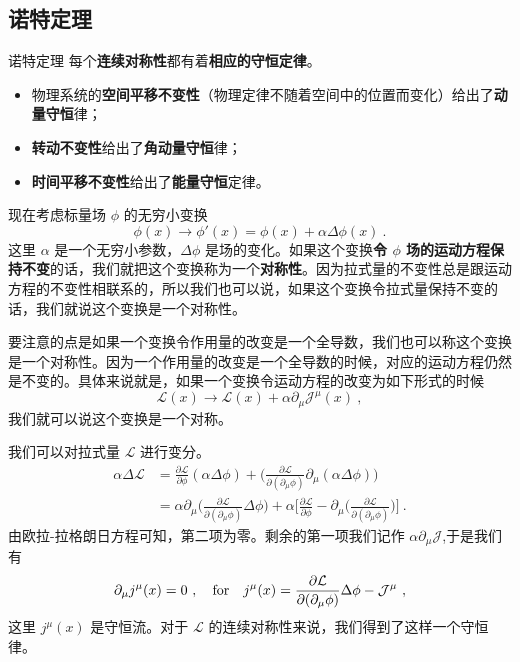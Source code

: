\subsection{诺特定理}
\begin{theorem}{诺特定理}
每个\textbf{连续对称性}都有着\textbf{相应的守恒定律}。
\begin{itemize}
\item 物理系统的\textbf{空间平移不变性}（物理定律不随着空间中的位置而变化）给出了\textbf{动量守恒}律；
\item \textbf{转动不变性}给出了\textbf{角动量守恒}律；
\item \textbf{时间平移不变性}给出了\textbf{能量守恒}定律。
\end{itemize}
\end{theorem}
现在考虑标量场 $\phi$ 的无穷小变换
\begin{equation}
\phi(x) \rightarrow \phi'(x) = \phi(x) +\alpha \Delta \phi (x)~.
\end{equation}
这里 $\alpha$ 是一个无穷小参数，$\Delta \phi$ 是场的变化。如果这个变换\textbf{令 $\phi$ 场的运动方程保持不变}的话，我们就把这个变换称为一个\textbf{对称性}。因为拉式量的不变性总是跟运动方程的不变性相联系的，所以我们也可以说，如果这个变换令拉式量保持不变的话，我们就说这个变换是一个对称性。

要注意的点是如果一个变换令作用量的改变是一个全导数，我们也可以称这个变换是一个对称性。因为一个作用量的改变是一个全导数的时候，对应的运动方程仍然是不变的。具体来说就是，如果一个变换令运动方程的改变为如下形式的时候
\begin{equation}
\mathcal L(x) \rightarrow \mathcal L (x) +\alpha \partial_\mu \mathcal J^\mu (x)~,
\end{equation}
我们就可以说这个变换是一个对称。

我们可以对拉式量 $\mathcal L$ 进行变分。
\begin{align}\nonumber
\alpha \Delta \mathcal L & = \frac{\partial \mathcal L}{\partial \phi} (\alpha \Delta \phi) + \bigg( \frac{\partial \mathcal L}{\partial(\partial_\mu \phi)} \partial_\mu(\alpha \Delta \phi)\bigg) \\
& = \alpha \partial_\mu \bigg( \frac{\partial \mathcal L}{\partial (\partial_\mu\phi)} \Delta \phi \bigg) + \alpha \bigg[ \frac{\partial \mathcal L}{\partial \phi} - \partial_\mu \bigg( \frac{\partial \mathcal L}{\partial(\partial_\mu \phi)} \bigg) \bigg]~.
\end{align}
由欧拉-拉格朗日方程可知，第二项为零。剩余的第一项我们记作 $\alpha \partial_\mu \mathcal J$,于是我们有
\begin{equation}
\partial_\mu j^\mu(x) = 0~, \quad {\rm for}\quad j^\mu(x) = \frac{\partial \mathcal L}{\partial(\partial_\mu \phi)} \Delta \phi - \mathcal J^\mu~,
\end{equation}
这里 $j^\mu(x)$ 是守恒流。对于 $\mathcal L$ 的连续对称性来说，我们得到了这样一个守恒律。


